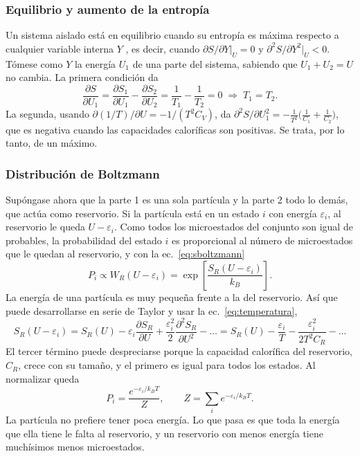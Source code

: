 \documentclass[letterpaper,12pt]{article}
\begin{document}
\subsubsection*{Equilibrio y aumento de la entropía}
Un sistema aislado está en equilibrio cuando su entropía es máxima respecto a cualquier variable interna $Y$ \cite{garciacolin}, es decir, cuando $\partial S/\partial Y|_U=0$ y $\partial^2S/\partial Y^2|_U<0$. Tómese como $Y$ la energía $U_1$ de una parte del sistema, sabiendo que $U_1+U_2=U$ no cambia. La primera condición da
\begin{equation}
  \frac{\partial S}{\partial U_1}=\frac{\partial S_1}{\partial U_1}-\frac{\partial S_2}{\partial U_2}=\frac{1}{T_1}-\frac{1}{T_2}=0
  \;\Rightarrow\; T_1=T_2 .
\end{equation}
La segunda, usando $\partial(1/T)/\partial U=-1/(T^2C_V)$, da $\partial^2S/\partial U_1^2=-\frac{1}{T^2}\big(\frac{1}{C_1}+\frac{1}{C_2}\big)$, que es negativa cuando las capacidades caloríficas son positivas. Se trata, por lo tanto, de un máximo.

\subsubsection*{Distribución de Boltzmann}
Supóngase ahora que la parte 1 es una sola partícula y la parte 2 todo lo demás, que actúa como reservorio. Si la partícula está en un estado $i$ con energía $\varepsilon_i$, al reservorio le queda $U-\varepsilon_i$. Como todos los microestados del conjunto son igual de probables, la probabilidad del estado $i$ es proporcional al número de microestados que le quedan al reservorio, y con la ec.~\ref{eq:sboltzmann}
\begin{equation}
  P_i\propto W_R(U-\varepsilon_i)=\exp\!\left[\frac{S_R(U-\varepsilon_i)}{k_B}\right].
\end{equation}
La energía de una partícula es muy pequeña frente a la del reservorio. Así que puede desarrollarse en serie de Taylor y usar la ec.~\ref{eq:temperatura},
\begin{equation}
  S_R(U-\varepsilon_i)=S_R(U)-\varepsilon_i\frac{\partial S_R}{\partial U}+\frac{\varepsilon_i^2}{2}\frac{\partial^2S_R}{\partial U^2}-\dots
  =S_R(U)-\frac{\varepsilon_i}{T}-\frac{\varepsilon_i^2}{2T^2C_R}-\dots
\end{equation}
El tercer término puede despreciarse porque la capacidad calorífica del reservorio, $C_R$, crece con su tamaño, y el primero es igual para todos los estados. Al normalizar queda
\begin{equation}
  P_i=\frac{e^{-\varepsilon_i/k_BT}}{Z},\qquad Z=\sum_i e^{-\varepsilon_i/k_BT}.
  \label{eq:boltzmann}
\end{equation}
La partícula no prefiere tener poca energía. Lo que pasa es que toda la energía que ella tiene le falta al reservorio, y un reservorio con menos energía tiene muchísimos menos microestados.
\end{document}
